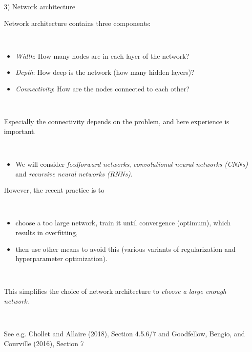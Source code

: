 \documentclass[
  10pt,
  ignorenonframetext,
]{beamer}
\providecommand{\tightlist}{%
  \setlength{\itemsep}{0pt}\setlength{\parskip}{0pt}}
\begin{document}
\begin{frame}
\begin{block}{3) Network architecture}
\protect\hypertarget{network-architecture}{}
\(~\)

Network architecture contains three components:

\(~\)

\begin{itemize}
\item
  \emph{Width}: How many nodes are in each layer of the network?
\item
  \emph{Depth}: How deep is the network (how many hidden layers)?
\item
  \emph{Connectivity}: How are the nodes connected to each other?
\end{itemize}

\(~\)

Especially the connectivity depends on the problem, and here experience
is important.

\(~\)

\begin{itemize}
\tightlist
\item
  We will consider \emph{feedforward networks}, \emph{convolutional
  neural networks (CNNs)} and \emph{recursive neural networks (RNNs)}.
\end{itemize}
\end{block}
\end{frame}

\begin{frame}
However, the recent practice is to

\(~\)

\begin{itemize}
\tightlist
\item
  choose a too large network, train it until convergence (optimum),
  which results in overfitting,
\end{itemize}

\vspace{2mm}

\begin{itemize}
\tightlist
\item
  then use other means to avoid this (various variants of regularization
  and hyperparameter optimization).
\end{itemize}

\(~\)

This simplifies the choice of network architecture to \emph{choose a
large enough network}.

\(~\)

See e.g. Chollet and Allaire (2018), Section 4.5.6/7 and Goodfellow,
Bengio, and Courville (2016), Section 7
\end{frame}
\end{document}
